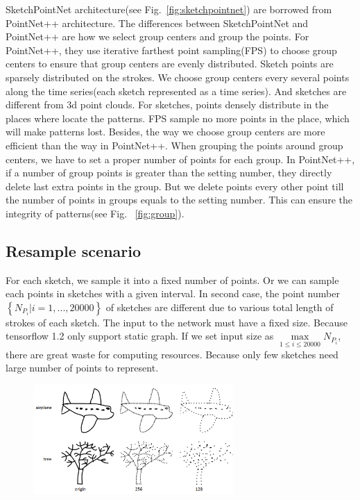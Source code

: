 SketchPointNet architecture(see Fig.~\ref{fig:sketchpointnet}) are borrowed from PointNet++ architecture. The differences between SketchPointNet and PointNet++ are how we select group centers and group the points. For PointNet++, they use iterative farthest point sampling(FPS) to choose group centers to ensure that group centers are evenly distributed. Sketch points are sparsely distributed on the strokes. We choose group centers every several points along the time series(each sketch represented as a time series). And sketches are different from 3d point clouds. For sketches, points densely distribute in the places where locate the patterns. FPS sample no more points in the place, which will make patterns lost. Besides, the way we choose group centers are more efficient than the way in PointNet++. When grouping the points around group centers, we have to set a proper number of points for each group. In PointNet++, if a number of group points  is greater than the setting number, they directly delete last extra points in the group. But we delete points every other point till the number of points in groups equals to the setting number. This can ensure the integrity of patterns(see Fig. ~\ref{fig:group}).

\subsection{Resample scenario}
\label{ssec:resample_scenario}

For each sketch, we sample it into a fixed number of points. Or we can sample each points in sketches with a given interval. In second case, the point number $\left\{ N_{P_i}| i = 1, ..., 20000 \right\}$ of sketches are different due to various total length of strokes of each sketch. The input to the network must have a fixed size. Because tensorflow 1.2 only support static graph. If we set input size as $\max \limits_{1 \le i \le 20000} N_{P_i}$, there are great waste for computing resources. Because only few sketches need large number of points to represent.

\begin{figure}
    \center
    \includegraphics[width=3in]{images/resample2.png}
    \label{fig:resample}
\end{figure}

